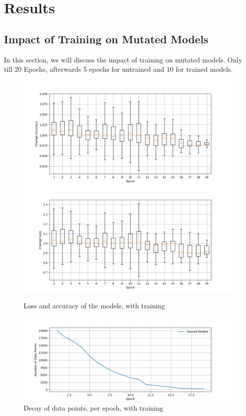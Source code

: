\section{Results}\label{sec:results}

\subsection{Impact of Training on Mutated Models}\label{subsec:impact-of-training-on-mutated-models}
In this section, we will discuss the impact of training on mutated models.
Only till 20 Epochs, afterwards 5 epochs for untrained and 10 for trained models.
\begin{figure}
    \centering
    \includegraphics[width=\textwidth]{plots/Trained_Change_Acc.png}
    \includegraphics[width=\textwidth]{plots/Trained_Change_Loss.png}
    \caption{Loss and accuracy of the models, with training}
    \label{fig:loss-accuracy-training}
\end{figure}
\begin{figure}
    \centering
    \includegraphics[width=\textwidth]{plots/Trained_Points_perEpoch.png}
    \caption{Decay of data points, per epoch, with training}
    \label{fig:decay_training}
\end{figure}
